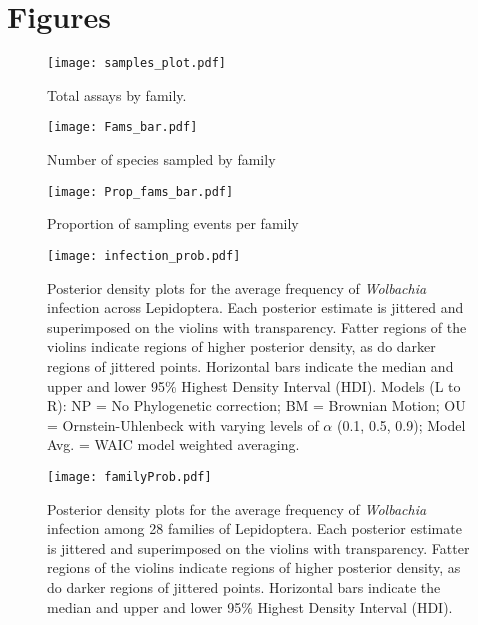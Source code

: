 \documentclass{frontiersSCNS}
\begin{document}
\section*{Figures}

\begin{subfigures}
\begin{figure}[h!]
\begin{center}
\texttt{[image: samples\_plot.pdf]}
\end{center}
\caption{Total assays by family.}
\label{samples}
\end{figure}
\newpage

\begin{figure}[h!]
\begin{center}
\texttt{[image: Fams\_bar.pdf]}
\end{center}
\caption{Number of species sampled by family}
\label{species}
\end{figure}
\newpage

\begin{figure}[h!]
\begin{center}
\texttt{[image: Prop\_fams\_bar.pdf]}
\end{center}
\caption{Proportion of sampling events per family}
\label{proportion}
\end{figure}
\end{subfigures}
\newpage

\begin{figure}[h!]
  \begin{center}
    \texttt{[image: infection\_prob.pdf]}
    \caption{Posterior density plots for the average frequency of \textit{Wolbachia} infection across Lepidoptera. Each posterior estimate is jittered and superimposed on the violins with transparency. Fatter regions of the  violins indicate regions of higher posterior density, as do darker regions of jittered points. Horizontal bars indicate the median and upper and lower 95\% Highest Density Interval (HDI).  Models (L to R): NP = No Phylogenetic correction; BM = Brownian Motion; OU = Ornstein-Uhlenbeck with varying levels of $\alpha$ (0.1, 0.5, 0.9); Model Avg. = WAIC model weighted averaging.}
 \label{grand}
  \end{center}
\end{figure}
\newpage 

\begin{figure}[h!]
  \begin{center}
    \texttt{[image: familyProb.pdf]}
    \caption{Posterior density plots for the average frequency of \textit{Wolbachia} infection among 28 families of Lepidoptera. Each posterior estimate is jittered and superimposed on the violins with transparency. Fatter regions of the  violins indicate regions of higher posterior density, as do darker regions of jittered points. Horizontal bars indicate the median and upper and lower 95\% Highest Density Interval (HDI).}
 \label{familyplot}
  \end{center}
\end{figure}
\newpage
\end{document}
